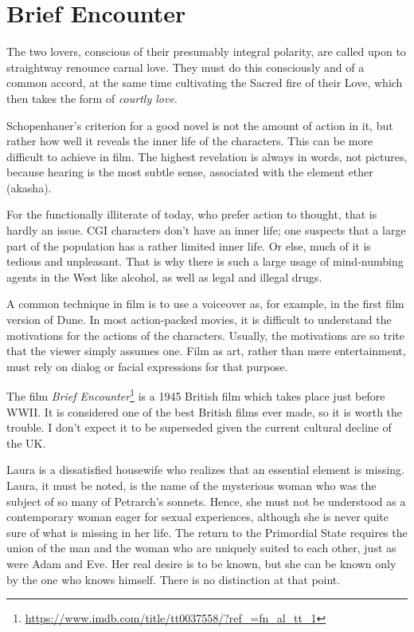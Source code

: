 \section{Brief Encounter}

\begin{quotex}
The two lovers, conscious of their presumably integral polarity, are called upon to straightway renounce carnal love. They must do this consciously and of a common accord, at the same time cultivating the Sacred fire of their Love, which then takes the form of \emph{courtly love}.
\end{quotex}



Schopenhauer's criterion for a good novel is not the amount of action in it, but rather how well it reveals the inner life of the characters. This can be more difficult to achieve in film. The highest revelation is always in words, not pictures, because hearing is the most subtle sense, associated with the element ether (akasha).

For the functionally illiterate of today, who prefer action to thought, that is hardly an issue. CGI characters don't have an inner life; one suspects that a large part of the population has a rather limited inner life. Or else, much of it is tedious and unpleasant. That is why there is such a large usage of mind-numbing agents in the West like alcohol, as well as legal and illegal drugs.

A common technique in film is to use a voiceover as, for example, in the first film version of Dune. In most action-packed movies, it is difficult to understand the motivations for the actions of the characters. Usually, the motivations are so trite that the viewer simply assumes one. Film as art, rather than mere entertainment, must rely on dialog or facial expressions for that purpose.

The film \textit{Brief Encounter}\footnote{\url{https://www.imdb.com/title/tt0037558/?ref_=fn_al_tt_1}} is a 1945 British film which takes place just before WWII. It is considered one of the best British films ever made, so it is worth the trouble. I don't expect it to be superseded given the current cultural decline of the UK.

Laura is a dissatisfied housewife who realizes that an essential element is missing. Laura, it must be noted, is the name of the mysterious woman who was the subject of so many of Petrarch's sonnets. Hence, she must not be understood as a contemporary woman eager for sexual experiences, although she is never quite sure of what is missing in her life. The return to the Primordial State requires the union of the man and the woman who are uniquely suited to each other, just as were Adam and Eve. Her real desire is to be known, but she can be known only by the one who knows himself. There is no distinction at that point.

